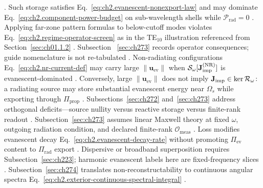 \cite{stratton1941}. Such storage satisfies
Eq.~\eqref{eq:ch2.evanescent-nonexport-law} and may dominate
Eq.~\eqref{eq:ch2.component-power-budget} on sub-wavelength shells while
\(\mathcal{P}_{\mathrm{rad}}=0\) \cite{stratton1941}. Applying far-zone pattern formulas to
below-cutoff modes violates Eq.~\eqref{eq:ch2.regime-operator-screen} as in the TE\(_{10}\)
illustration referenced from Section~\ref{sec:ch01.1.2} \cite{harrington2001}. Subsection
~\ref{sec:ch273} records operator consequences; guide nomenclature is not re-tabulated
\cite{stratton1941}. Non-radiating configurations Eq.~\eqref{eq:ch2.nr-current-def} may carry large
\(\|\mathbf{u}_{\mathrm{ev}}\|\) when \(\mathcal{S}_\omega[\mathbf{J}_{\mathrm{imp}}^{\mathrm{(NR)}}]\) is
evanescent-dominated \cite{stratton1941}. Conversely, large
\(\|\mathbf{u}_{\mathrm{ev}}\|\) does not imply \(\mathbf{J}_{\mathrm{imp}}\in\ker\mathcal{R}_\omega\): a radiating
source may store substantial evanescent energy near \(\Omega_s\) while exporting through
\(\Pi_{\mathrm{prop}}\) \cite{stratton1941}. Subsections~\ref{sec:ch272} and~\ref{sec:ch273}
address orthogonal deficits---source nullity versus reactive storage versus finite-rank readout
\cite{harrington2001}.
Subsection~\ref{sec:ch273} assumes linear Maxwell theory at fixed
\(\omega\), outgoing radiation condition, and declared finite-rank \(\mathcal{O}_{\mathrm{meas}}\)
\cite{stratton1941}. Loss modifies evanescent decay
Eq.~\eqref{eq:ch2.evanescent-decay-rate} without promoting \(\Pi_{\mathrm{ev}}\) content to
\(\Pi_{\mathrm{rad}}\) export \cite{stratton1941}. Dispersive or broadband superposition
requires Subsection~\ref{sec:ch223}; harmonic evanescent labels here are fixed-frequency slices
\cite{harrington2001}. Subsection~\ref{sec:ch274} translates non-reconstructability to
continuous angular spectra Eq.~\eqref{eq:ch2.exterior-continuous-spectral-integral}
\cite{stratton1941}.
